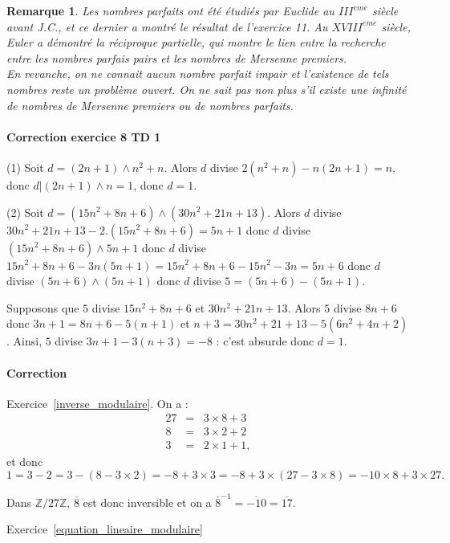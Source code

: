 \documentclass[11pt,a4paper]{article}
\newtheorem*{rem}{Remarque}
\newcommand{\Z}{\mathbb{Z}}
\begin{document}
\begin{rem}
Les nombres parfaits ont été étudiés par Euclide au $III^{eme}$ siècle avant J.C., et ce dernier a montré le résultat de l'exercice 11. Au $XVIII^{eme}$ siècle, Euler a démontré la réciproque partielle, qui montre le lien entre la recherche entre les nombres parfais pairs et les nombres de Mersenne premiers. \\
En revanche, on ne connait aucun nombre parfait impair et l'existence de tels nombres reste un problème ouvert. On ne sait pas non plus s'il existe une infinité de nombres de Mersenne premiers ou de nombres parfaits. 
\end{rem}


\paragraph{Correction exercice 8 TD 1}


(1) Soit $d=(2n+1)\wedge n^2+n$. Alors $d$ divise $2(n^2+n)-n(2n+1)=n$, donc $d | (2n+1)\wedge n=1$, donc $d=1$.

(2) Soit $d=(15n^2+8n+6)\wedge (30 n^2+21n+13)$. Alors $d$ divise  $30 n^2+21n+13-2.(15 n^2+8n+6)=5n+1$ donc $d$ divise $(15 n^2+8n+6)\wedge 5n+1$ donc $d$ divise $15 n^2+8n+6-3n(5n+1)=15 n^2+8n+6-15n^2-3n=5n+6$ donc $d$ divise $(5n+6)\wedge(5n+1)$ donc $d$ divise $5=(5n+6)-(5n+1)$.

Supposons que $5$ divise $15n^2+8n+6$ et $30 n^2+21n+13$. Alors $5$ divise $8n+6$ donc $3n+1=8n+6-5(n+1)$ et  $n+3=30n^2+21+13-5(6n^2+4n+2)$. Ainsi, $5$ divise $3n+1-3(n+3)=-8$ : c'est absurde donc $d=1$. 



\paragraph{Correction}

Exercice~\ref{inverse_modulaire}. On a  :\[\begin{aligned} 27&=&3\times 8+3\\ 8&=&3\times 2+2\\ 3&=&2\times 1+1,\end{aligned}\] et donc \[1=3-2=3-(8-3\times 2)=-8+3\times 3=-8+3\times (27-3\times 8)=-10\times 8+3\times 27.\]

Dans $\Z/27\Z$, $\overline{8}$ est donc inversible et on a  $\overline{8}^{-1}=\overline{-10}=\overline{17}$.

Exercice~\ref{equation_lineaire_modulaire}
\end{document}
